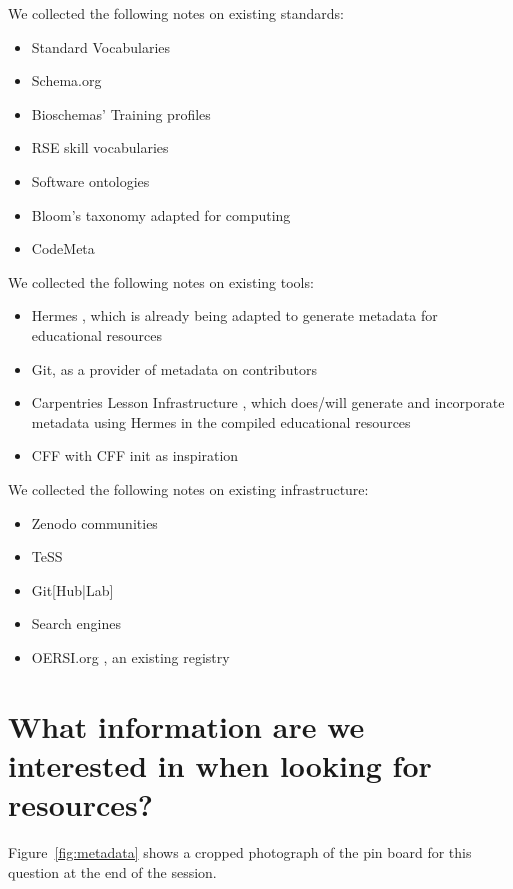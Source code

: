 \documentclass{scrartcl}
\begin{document}
We collected the following notes on existing standards:
\begin{itemize}
\item Standard Vocabularies
\item Schema.org
\item Bioschemas’ Training profiles \cite{castro2023bioschemas}
\item RSE skill vocabularies
\item Software ontologies
\item Bloom’s taxonomy adapted for computing
\item CodeMeta \cite{CMProject}
\end{itemize}

We collected the following notes on existing tools:
\begin{itemize}
\item Hermes \cite{Meinel_hermes}, which is already being adapted to generate metadata for educational resources
\item Git, as a provider of metadata on contributors
\item Carpentries Lesson Infrastructure \cite{CWB}, which does/will generate and incorporate metadata using Hermes in the compiled educational resources
\item CFF \cite{druskat2021citation, CFF} with CFF init \cite{Spaaks_cffinit_2023} as inspiration
\end{itemize}

We collected the following notes on existing infrastructure:
\begin{itemize}
\item Zenodo communities
\item TeSS \cite{beard2020tess, TESS}
\item Git[Hub|Lab]
\item Search engines
\item OERSI.org \cite{OERSI}, an existing registry
\end{itemize}

\section*{What information are we interested in when looking for resources?}

Figure~\ref{fig:metadata} shows a cropped photograph of the pin board for this question at the end of the session.
\end{document}
